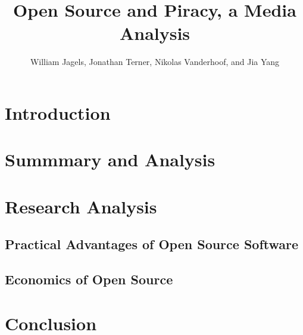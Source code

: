\documentclass[12pt,babel,english,man,natbib,apacite]{apa6}
\title{Open Source and Piracy, a Media Analysis}
\author{William Jagels, Jonathan Terner, Nikolas Vanderhoof, and Jia Yang}
\affiliation{Binghamton University}
\begin{document}
\maketitle
\section{Introduction}
\section{Summmary and Analysis}

\newpage
\section{Research Analysis}
\subsection{Practical Advantages of Open Source Software}

\newpage
\subsection{Economics of Open Source}

\newpage
\section{Conclusion}
\nocite{*}


\end{document}
